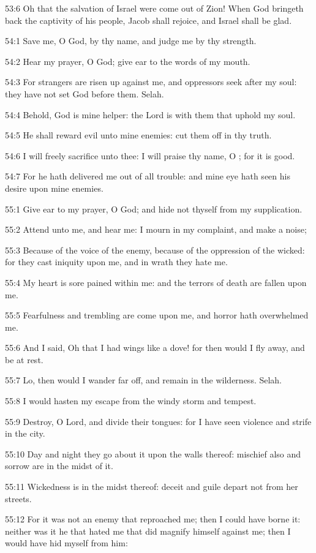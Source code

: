 53:6 Oh that the salvation of Israel were come out of Zion! When God bringeth back the captivity of his people, Jacob shall rejoice, and Israel shall be glad.



54:1 Save me, O God, by thy name, and judge me by thy strength.

54:2 Hear my prayer, O God; give ear to the words of my mouth.

54:3 For strangers are risen up against me, and oppressors seek after my soul: they have not set God before them. Selah.

54:4 Behold, God is mine helper: the Lord is with them that uphold my soul.

54:5 He shall reward evil unto mine enemies: cut them off in thy truth.

54:6 I will freely sacrifice unto thee: I will praise thy name, O \LORD; for it is good.

54:7 For he hath delivered me out of all trouble: and mine eye hath seen his desire upon mine enemies.



55:1 Give ear to my prayer, O God; and hide not thyself from my supplication.

55:2 Attend unto me, and hear me: I mourn in my complaint, and make a noise;

55:3 Because of the voice of the enemy, because of the oppression of the wicked: for they cast iniquity upon me, and in wrath they hate me.

55:4 My heart is sore pained within me: and the terrors of death are fallen upon me.

55:5 Fearfulness and trembling are come upon me, and horror hath overwhelmed me.

55:6 And I said, Oh that I had wings like a dove! for then would I fly away, and be at rest.

55:7 Lo, then would I wander far off, and remain in the wilderness.  Selah.

55:8 I would hasten my escape from the windy storm and tempest.

55:9 Destroy, O Lord, and divide their tongues: for I have seen violence and strife in the city.

55:10 Day and night they go about it upon the walls thereof: mischief also and sorrow are in the midst of it.

55:11 Wickedness is in the midst thereof: deceit and guile depart not from her streets.

55:12 For it was not an enemy that reproached me; then I could have borne it: neither was it he that hated me that did magnify himself against me; then I would have hid myself from him:

